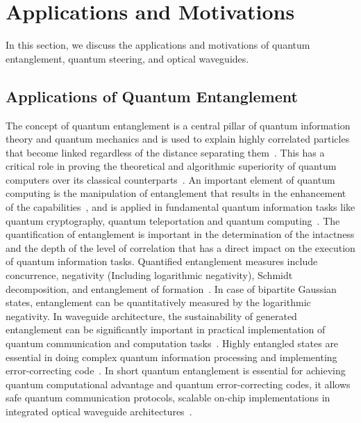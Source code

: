 \section{Applications and Motivations}
In this section, we discuss the applications and motivations of quantum entanglement, quantum steering, and optical waveguides.

\subsection{Applications of Quantum Entanglement}
The concept of quantum entanglement is a central pillar of quantum information theory and quantum mechanics and is used to explain highly correlated particles that become linked regardless of the distance separating them~\cite{NielsenChuang2000,Horodecki2009}. This has a critical role in proving the theoretical and algorithmic superiority of quantum computers over its classical counterparts~\cite{Volya2024}.
An important element of quantum computing is the manipulation of entanglement that results in the enhancement of the capabilities~\cite{Volya2024}, and is applied in fundamental quantum information tasks like quantum cryptography, quantum teleportation and quantum computing~\cite{NielsenChuang2000}. The quantification of entanglement is important in the determination of the intactness and the depth of the level of correlation that has a direct impact on the execution of quantum information tasks. Quantified entanglement measures include concurrence, negativity (Including logarithmic negativity), Schmidt decomposition, and entanglement of formation~\cite{Horodecki2009}. In case of bipartite Gaussian states, entanglement can be quantitatively measured by the logarithmic negativity. In waveguide architecture, the sustainability of generated entanglement can be significantly important in practical implementation of quantum communication and computation tasks~\cite{Rai2010}.
Highly entangled states are essential in doing complex quantum information processing and implementing error-correcting code~\cite{Volya2024}.
In short quantum entanglement is essential for achieving quantum computational advantage and quantum error-correcting codes, it allows safe quantum communication protocols, scalable on-chip implementations in integrated optical waveguide architectures~\cite{NielsenChuang2000,Horodecki2009,Volya2024,Weedbrook2012,Masada2016,Rai2010}.

